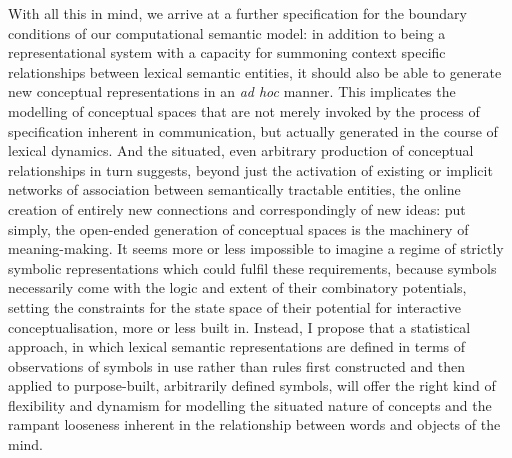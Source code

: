 With all this in mind, we arrive at a further specification for the boundary conditions of our computational semantic model: in addition to being a representational system with a capacity for summoning context specific relationships between lexical semantic entities, it should also be able to generate new conceptual representations in an \emph{ad hoc} manner.  This implicates the modelling of conceptual spaces that are not merely invoked by the process of specification inherent in communication, but actually generated in the course of lexical dynamics.  And the situated, even arbitrary production of conceptual relationships in turn suggests, beyond just the activation of existing or implicit networks of association between semantically tractable entities, the online creation of entirely new connections and correspondingly of new ideas: put simply, the open-ended generation of conceptual spaces is the machinery of meaning-making.  It seems more or less impossible to imagine a regime of strictly symbolic representations which could fulfil these requirements, because symbols necessarily come with the logic and extent of their combinatory potentials, setting the constraints for the state space of their potential for interactive conceptualisation, more or less built in.  Instead, I propose that a statistical approach, in which lexical semantic representations are defined in terms of observations of symbols in use rather than rules first constructed and then applied to purpose-built, arbitrarily defined symbols, will offer the right kind of flexibility and dynamism for modelling the situated nature of concepts and the rampant looseness inherent in the relationship between words and objects of the mind.


